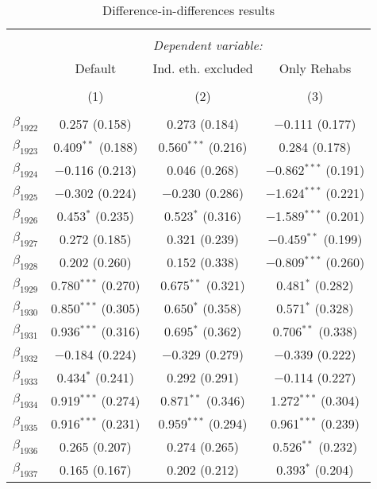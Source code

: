
\begin{table}[!h] \centering 
  \caption{Difference-in-differences results} 
  \label{dif_table} 
\small 
\begin{tabular}{@{\extracolsep{5pt}}lccc} 
\\[-1.8ex]\hline 
\hline \\[-1.8ex] 
 & \multicolumn{3}{c}{\textit{Dependent variable:}} \\ 
\cline{2-4} 
 & Default & Ind. eth. excluded & Only Rehabs \\ 
\\[-1.8ex] & (1) & (2) & (3)\\ 
\hline \\[-1.8ex] 
 $\beta_{1922}$ & 0.257 (0.158) & 0.273 (0.184) & $-$0.111 (0.177) \\ 
  $\beta_{1923}$ & 0.409$^{**}$ (0.188) & 0.560$^{***}$ (0.216) & 0.284 (0.178) \\ 
  $\beta_{1924}$ & $-$0.116 (0.213) & 0.046 (0.268) & $-$0.862$^{***}$ (0.191) \\ 
  $\beta_{1925}$ & $-$0.302 (0.224) & $-$0.230 (0.286) & $-$1.624$^{***}$ (0.221) \\ 
  $\beta_{1926}$ & 0.453$^{*}$ (0.235) & 0.523$^{*}$ (0.316) & $-$1.589$^{***}$ (0.201) \\ 
  $\beta_{1927}$ & 0.272 (0.185) & 0.321 (0.239) & $-$0.459$^{**}$ (0.199) \\ 
  $\beta_{1928}$ & 0.202 (0.260) & 0.152 (0.338) & $-$0.809$^{***}$ (0.260) \\ 
  $\beta_{1929}$ & 0.780$^{***}$ (0.270) & 0.675$^{**}$ (0.321) & 0.481$^{*}$ (0.282) \\ 
  $\beta_{1930}$ & 0.850$^{***}$ (0.305) & 0.650$^{*}$ (0.358) & 0.571$^{*}$ (0.328) \\ 
  $\beta_{1931}$ & 0.936$^{***}$ (0.316) & 0.695$^{*}$ (0.362) & 0.706$^{**}$ (0.338) \\ 
  $\beta_{1932}$ & $-$0.184 (0.224) & $-$0.329 (0.279) & $-$0.339 (0.222) \\ 
  $\beta_{1933}$ & 0.434$^{*}$ (0.241) & 0.292 (0.291) & $-$0.114 (0.227) \\ 
  $\beta_{1934}$ & 0.919$^{***}$ (0.274) & 0.871$^{**}$ (0.346) & 1.272$^{***}$ (0.304) \\ 
  $\beta_{1935}$ & 0.916$^{***}$ (0.231) & 0.959$^{***}$ (0.294) & 0.961$^{***}$ (0.239) \\ 
  $\beta_{1936}$ & 0.265 (0.207) & 0.274 (0.265) & 0.526$^{**}$ (0.232) \\ 
  $\beta_{1937}$ & 0.165 (0.167) & 0.202 (0.212) & 0.393$^{*}$ (0.204) \\ 

\end{tabular}
\end{table}
